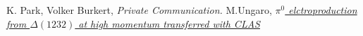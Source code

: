 \begin{thebibliography}{mybib}
      {K. Park, Volker Burkert},         {\it Private Communication.}
  {M.Ungaro},  \href{http://www.jlab.org/~ungaro/maureepage/proj/pi0_Delta/main.html}{\it $\pi^0$ elctroproduction from $\Delta(1232)$ at high momentum transferred with CLAS}
\end{thebibliography}
